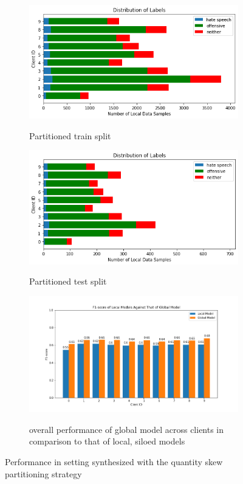 \documentclass[letterpaper]{article} %
\begin{document}
\begin{figure}[hbt!]

\begin{subfigure}{\columnwidth}
{\includegraphics[width=\columnwidth]{iid-quantity-skew_distribution_of_labels_5}}
\caption{Partitioned train split}
\end{subfigure}

\begin{subfigure}{\columnwidth}
{\includegraphics[width=\columnwidth]{iid-quantity-skew_test_set_distribution_of_labels_5}}
\caption{Partitioned test split}
\end{subfigure}

\begin{subfigure}{\columnwidth}
{\includegraphics[width=\columnwidth]{iid-quantity-skew_seed_5performance_of_models_on_client_data_f1score}}
\caption{overall performance of global model across clients in comparison to that of local, siloed models}
\end{subfigure}

\caption{Performance in setting synthesized with the quantity skew partitioning strategy}
\end{figure}
\end{document}
